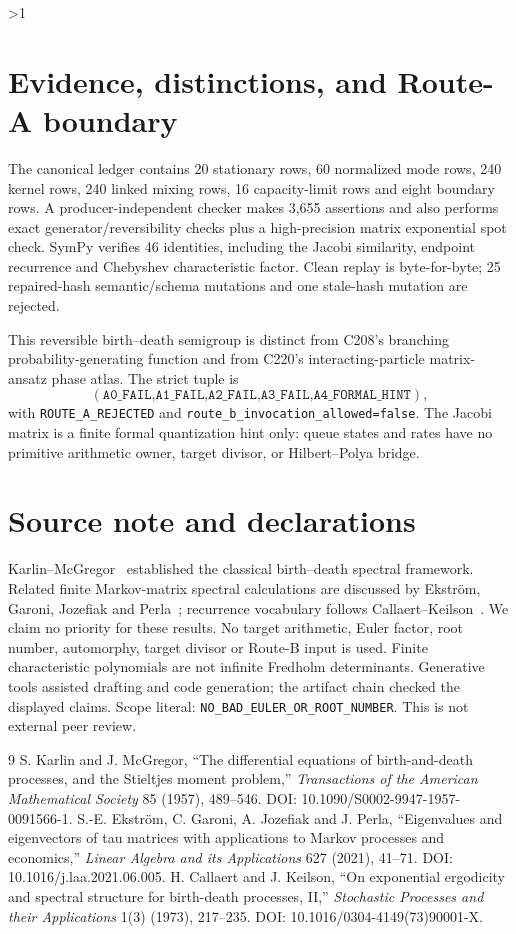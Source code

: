 \documentclass[11pt]{article}
\begin{document}
\ifnum\CRevisionRound>1
\section{Evidence, distinctions, and Route-A boundary}
The canonical ledger contains 20 stationary rows, 60 normalized mode rows,
240 kernel rows, 240 linked mixing rows, 16 capacity-limit rows and eight
boundary rows.  A producer-independent checker makes 3,655 assertions and
also performs exact generator/reversibility checks plus a high-precision matrix
exponential spot check.  SymPy verifies 46 identities, including the Jacobi
similarity, endpoint recurrence and Chebyshev characteristic factor.  Clean
replay is byte-for-byte; 25 repaired-hash semantic/schema mutations and one
stale-hash mutation are rejected.

This reversible birth--death semigroup is distinct from C208's branching
probability-generating function and from C220's interacting-particle
matrix-ansatz phase atlas.  The strict tuple is
\[
 (\texttt{A0\_FAIL,A1\_FAIL,A2\_FAIL,A3\_FAIL,A4\_FORMAL\_HINT}),
\]
with \texttt{ROUTE\_A\_REJECTED} and
\texttt{route\_b\_invocation\_allowed=false}.  The Jacobi
matrix is a finite formal quantization hint only: queue states and rates have
no primitive arithmetic owner, target divisor, or Hilbert--Polya bridge.
\fi

\section*{Source note and declarations}
Karlin--McGregor~\cite{km1957} established the classical birth--death spectral
framework.  Related finite Markov-matrix spectral calculations are discussed
by Ekstr{\"o}m, Garoni, Jozefiak and Perla~\cite{egjp2021}; recurrence
vocabulary follows Callaert--Keilson~\cite{ck1973}.  We claim no priority for these results.  No target
arithmetic, Euler factor, root number, automorphy, target divisor or Route-B
input is used.  Finite characteristic polynomials are not infinite Fredholm
determinants.  Generative tools assisted drafting and code generation; the
artifact chain checked the displayed claims.  Scope literal:
\texttt{NO\_BAD\_EULER\_OR\_ROOT\_NUMBER}.  This is not external peer review.

\begin{thebibliography}{9}
 S. Karlin and J. McGregor, ``The differential equations of
birth-and-death processes, and the Stieltjes moment problem,''
\emph{Transactions of the American Mathematical Society} 85 (1957), 489--546.
DOI: 10.1090/S0002-9947-1957-0091566-1.
 S.-E. Ekstr{\"o}m, C. Garoni, A. Jozefiak and J. Perla,
``Eigenvalues and eigenvectors of tau matrices with applications to Markov
processes and economics,'' \emph{Linear Algebra and its Applications} 627
(2021), 41--71. DOI: 10.1016/j.laa.2021.06.005.
 H. Callaert and J. Keilson, ``On exponential ergodicity and
spectral structure for birth-death processes, II,'' \emph{Stochastic Processes
and their Applications} 1(3) (1973), 217--235. DOI:
10.1016/0304-4149(73)90001-X.
\end{thebibliography}
\end{document}
